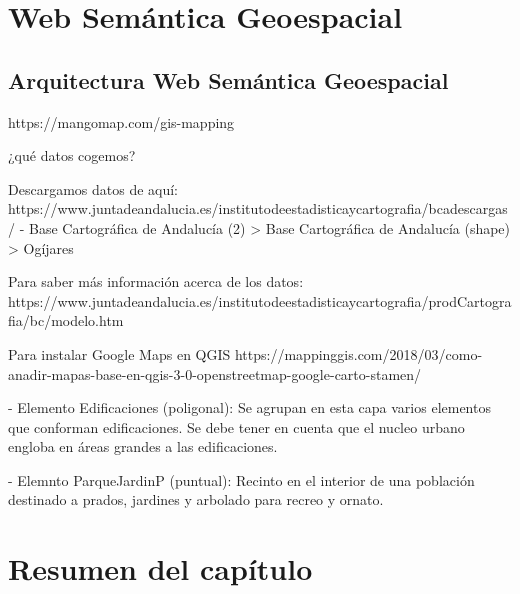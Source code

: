 \section{Web Semántica Geoespacial}


\subsection{Arquitectura Web Semántica Geoespacial}



% 

https://mangomap.com/gis-mapping


¿qué datos cogemos?

Descargamos datos de aquí: https://www.juntadeandalucia.es/institutodeestadisticaycartografia/bcadescargas/
- Base Cartográfica de Andalucía (2) > Base Cartográfica de Andalucía (shape) > Ogíjares

Para saber más información acerca de los datos: https://www.juntadeandalucia.es/institutodeestadisticaycartografia/prodCartografia/bc/modelo.htm

Para instalar Google Maps en QGIS
https://mappinggis.com/2018/03/como-anadir-mapas-base-en-qgis-3-0-openstreetmap-google-carto-stamen/


- Elemento Edificaciones (poligonal): Se agrupan en esta capa varios elementos que conforman edificaciones. Se debe tener en cuenta que el nucleo urbano engloba en áreas grandes a las edificaciones.

- Elemnto ParqueJardinP (puntual): Recinto en el interior de una población destinado a prados, jardines y arbolado
para recreo y ornato. 


\section{Resumen del capítulo}





